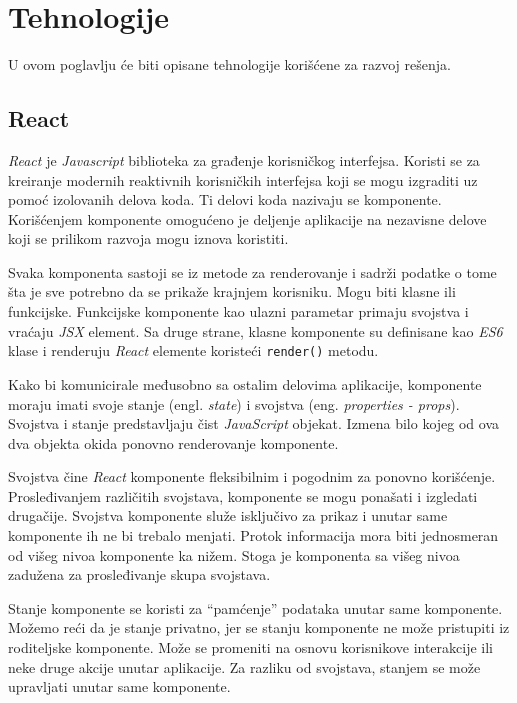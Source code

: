 \chapter{Tehnologije}\label{ch:tehnologije}

U ovom poglavlju će biti opisane tehnologije korišćene za razvoj rešenja.

\section{React}\label{sec:react}
\textit{React} je \textit{Javascript} biblioteka za građenje korisničkog interfejsa. Koristi se za kreiranje modernih 
reaktivnih korisničkih interfejsa koji se mogu izgraditi uz pomoć izolovanih delova koda. Ti delovi koda nazivaju 
se komponente. Korišćenjem komponente omogućeno je deljenje aplikacije na nezavisne delove koji se prilikom razvoja 
mogu iznova koristiti.~\cite{react}

Svaka komponenta sastoji se iz metode za renderovanje i sadrži podatke o tome šta je sve potrebno da se prikaže 
krajnjem korisniku. Mogu biti klasne ili funkcijske. Funkcijske komponente kao ulazni parametar primaju svojstva 
i vraćaju \textit{JSX} element. Sa druge strane, klasne komponente su definisane kao \textit{ES6} 
klase i renderuju \textit{React} elemente koristeći \texttt{render()} metodu. 

Kako bi komunicirale međusobno sa ostalim delovima aplikacije, komponente moraju imati svoje stanje (engl. \textit{state}) 
i svojstva (eng. \textit{properties - props}). Svojstva i stanje predstavljaju čist \textit{JavaScript} objekat. Izmena bilo kojeg 
od ova dva objekta okida ponovno renderovanje komponente. 

Svojstva čine \textit{React} komponente fleksibilnim i pogodnim za 
ponovno korišćenje. Prosleđivanjem različitih svojstava, komponente se mogu ponašati i izgledati drugačije. Svojstva komponente 
služe isključivo za prikaz i unutar same komponente ih ne bi trebalo menjati. Protok informacija mora biti jednosmeran od višeg 
nivoa komponente ka nižem. Stoga je komponenta sa višeg nivoa zadužena za prosleđivanje skupa svojstava.

Stanje komponente se koristi za “pamćenje” podataka unutar same komponente. Možemo reći da je stanje privatno, jer se stanju 
komponente ne može pristupiti iz roditeljske komponente. Može se promeniti na osnovu korisnikove interakcije ili neke druge 
akcije unutar aplikacije. Za razliku od svojstava, stanjem se može upravljati unutar same komponente.

